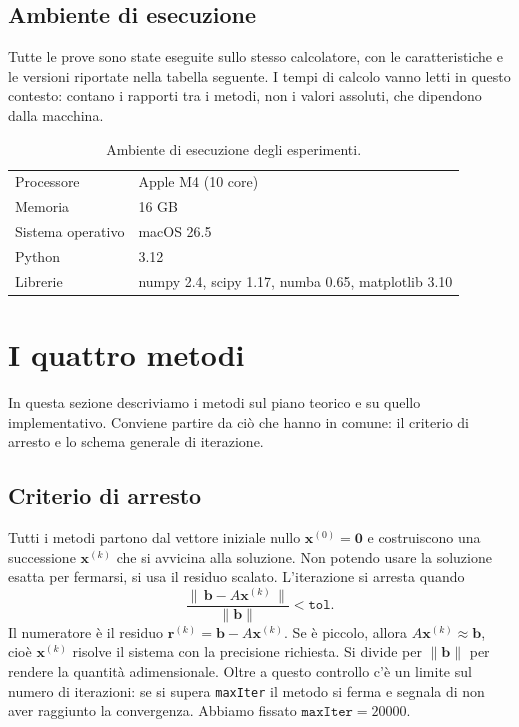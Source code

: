 \documentclass[11pt,a4paper]{article}
\begin{document}
\subsection{Ambiente di esecuzione}
Tutte le prove sono state eseguite sullo stesso calcolatore, con le
caratteristiche e le versioni riportate nella tabella seguente. I tempi
di calcolo vanno letti in questo contesto: contano i rapporti tra i metodi, non
i valori assoluti, che dipendono dalla macchina.

\begin{table}[H]
\centering
\caption{Ambiente di esecuzione degli esperimenti.}
\label{tab:ambiente}
\begin{tabular}{ll}
\toprule
Processore & Apple M4 (10 core) \\
Memoria & 16 GB \\
Sistema operativo & macOS 26.5 \\
Python & 3.12 \\
Librerie & numpy 2.4, scipy 1.17, numba 0.65, matplotlib 3.10 \\
\bottomrule
\end{tabular}
\end{table}

\section{I quattro metodi}\label{sec:metodi}
In questa sezione descriviamo i metodi sul piano teorico e su quello
implementativo. Conviene partire da ciò che hanno in comune: il criterio di
arresto e lo schema generale di iterazione.

\subsection{Criterio di arresto}
Tutti i metodi partono dal vettore iniziale nullo $\mathbf{x}^{(0)}=\mathbf{0}$
e costruiscono una successione $\mathbf{x}^{(k)}$ che si avvicina alla soluzione.
Non potendo usare la soluzione esatta per fermarsi, si usa il residuo scalato.
L'iterazione si arresta quando
\[
\frac{\|\,\mathbf{b}-A\mathbf{x}^{(k)}\,\|}{\|\mathbf{b}\|} < \texttt{tol}.
\]
Il numeratore è il residuo $\mathbf{r}^{(k)}=\mathbf{b}-A\mathbf{x}^{(k)}$. Se è
piccolo, allora $A\mathbf{x}^{(k)}\approx\mathbf{b}$, cioè $\mathbf{x}^{(k)}$
risolve il sistema con la precisione richiesta. Si divide per $\|\mathbf{b}\|$
per rendere la quantità adimensionale. Oltre a questo controllo c'è un limite sul
numero di iterazioni: se si supera \texttt{maxIter} il metodo si ferma e segnala
di non aver raggiunto la convergenza. Abbiamo fissato $\texttt{maxIter}=20000$.
\end{document}
